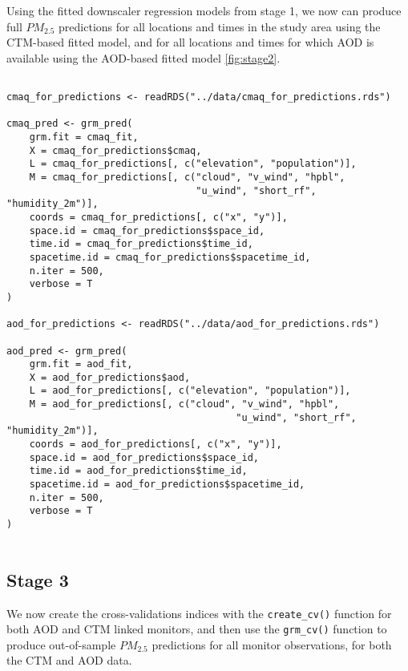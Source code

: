 \documentclass[12pt]{article}
\begin{document}
Using the fitted downscaler regression models from stage 1, we now can produce full $PM_2.5$ predictions for all locations and times in the study area using the CTM-based fitted model, and for all locations and times for which AOD is available using the AOD-based fitted model \ref{fig:stage2}.



\begin{lstlisting}

cmaq_for_predictions <- readRDS("../data/cmaq_for_predictions.rds")

cmaq_pred <- grm_pred(
    grm.fit = cmaq_fit,
    X = cmaq_for_predictions$cmaq,
    L = cmaq_for_predictions[, c("elevation", "population")],
    M = cmaq_for_predictions[, c("cloud", "v_wind", "hpbl",
                                 "u_wind", "short_rf", "humidity_2m")],
    coords = cmaq_for_predictions[, c("x", "y")],
    space.id = cmaq_for_predictions$space_id,
    time.id = cmaq_for_predictions$time_id,
    spacetime.id = cmaq_for_predictions$spacetime_id,
    n.iter = 500,
    verbose = T
)

aod_for_predictions <- readRDS("../data/aod_for_predictions.rds")

aod_pred <- grm_pred(
    grm.fit = aod_fit,
    X = aod_for_predictions$aod,
    L = aod_for_predictions[, c("elevation", "population")],
    M = aod_for_predictions[, c("cloud", "v_wind", "hpbl", 
                                        "u_wind", "short_rf", "humidity_2m")],
    coords = aod_for_predictions[, c("x", "y")],
    space.id = aod_for_predictions$space_id,
    time.id = aod_for_predictions$time_id,
    spacetime.id = aod_for_predictions$spacetime_id,
    n.iter = 500,
    verbose = T
)


\end{lstlisting}


\subsection*{Stage 3}

We now create the cross-validations indices with the \texttt{create\_cv()} function for both AOD and CTM linked monitors, and then use the \texttt{grm\_cv()} function to produce out-of-sample $PM_{2.5}$ predictions for all monitor observations, for both the CTM and AOD data.
\end{document}
